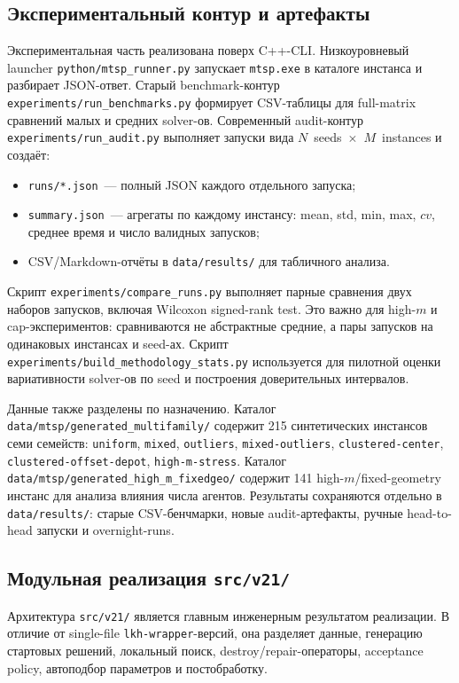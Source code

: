 \documentclass[14pt,a4paper]{extarticle}
\begin{document}
\subsection{Экспериментальный контур и артефакты}

Экспериментальная часть реализована поверх C++-CLI. Низкоуровневый launcher \texttt{python/mtsp\_runner.py} запускает \texttt{mtsp.exe} в каталоге инстанса и разбирает JSON-ответ. Старый benchmark-контур \texttt{experiments/run\_benchmarks.py} формирует CSV-таблицы для full-matrix сравнений малых и средних solver-ов. Современный audit-контур \texttt{experiments/run\_audit.py} выполняет запуски вида $N$~seeds~$\times$~$M$~instances и создаёт:
\begin{itemize}
  \item \texttt{runs/*.json}~--- полный JSON каждого отдельного запуска;
  \item \texttt{summary.json}~--- агрегаты по каждому инстансу: mean, std, min, max, $cv$, среднее время и число валидных запусков;
  \item CSV/Markdown-отчёты в \texttt{data/results/} для табличного анализа.
\end{itemize}

Скрипт \texttt{experiments/compare\_runs.py} выполняет парные сравнения двух наборов запусков, включая Wilcoxon signed-rank test. Это важно для high-$m$ и cap-экспериментов: сравниваются не абстрактные средние, а пары запусков на одинаковых инстансах и seed-ах. Скрипт \texttt{experiments/build\_methodology\_stats.py} используется для пилотной оценки вариативности solver-ов по seed и построения доверительных интервалов.

Данные также разделены по назначению. Каталог \texttt{data/mtsp/generated\_multifamily/} содержит 215 синтетических инстансов семи семейств: \texttt{uniform}, \texttt{mixed}, \texttt{outliers}, \texttt{mixed-outliers}, \texttt{clustered-center}, \texttt{clustered-offset-depot}, \texttt{high-m-stress}. Каталог \texttt{data/mtsp/generated\_high\_m\_fixedgeo/} содержит 141 high-$m$/fixed-geometry инстанс для анализа влияния числа агентов. Результаты сохраняются отдельно в \texttt{data/results/}: старые CSV-бенчмарки, новые audit-артефакты, ручные head-to-head запуски и overnight-runs.

\subsection{Модульная реализация \texttt{src/v21/}}

Архитектура \texttt{src/v21/} является главным инженерным результатом реализации. В отличие от single-file \texttt{lkh-wrapper}-версий, она разделяет данные, генерацию стартовых решений, локальный поиск, destroy/repair-операторы, acceptance policy, автоподбор параметров и постобработку.
\end{document}
